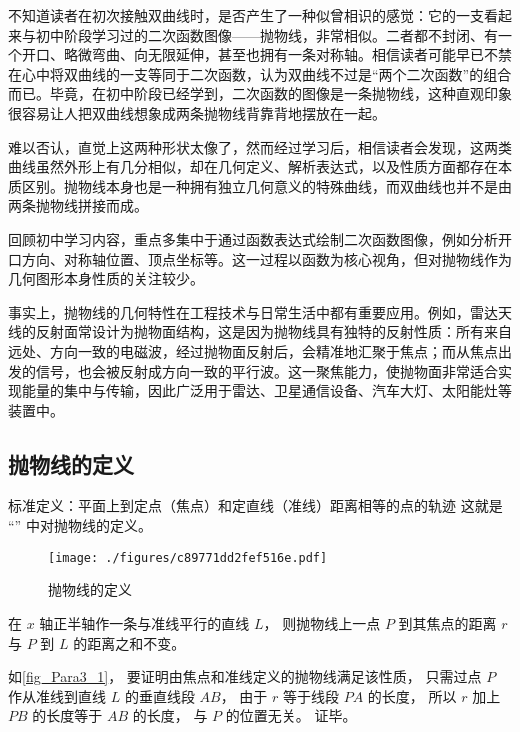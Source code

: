 
\begin{issues}
\issueDraft
\end{issues}


不知道读者在初次接触双曲线时，是否产生了一种似曾相识的感觉：它的一支看起来与初中阶段学习过的二次函数图像——抛物线，非常相似。二者都不封闭、有一个开口、略微弯曲、向无限延伸，甚至也拥有一条对称轴。相信读者可能早已不禁在心中将双曲线的一支等同于二次函数，认为双曲线不过是“两个二次函数”的组合而已。毕竟，在初中阶段已经学到，二次函数的图像是一条抛物线，这种直观印象很容易让人把双曲线想象成两条抛物线背靠背地摆放在一起。

难以否认，直觉上这两种形状太像了，然而经过学习后，相信读者会发现，这两类曲线虽然外形上有几分相似，却在几何定义、解析表达式，以及性质方面都存在本质区别。抛物线本身也是一种拥有独立几何意义的特殊曲线，而双曲线也并不是由两条抛物线拼接而成。

回顾初中学习内容，重点多集中于通过函数表达式绘制二次函数图像，例如分析开口方向、对称轴位置、顶点坐标等。这一过程以函数为核心视角，但对抛物线作为几何图形本身性质的关注较少。

事实上，抛物线的几何特性在工程技术与日常生活中都有重要应用。例如，雷达天线的反射面常设计为抛物面结构，这是因为抛物线具有独特的反射性质：所有来自远处、方向一致的电磁波，经过抛物面反射后，会精准地汇聚于焦点；而从焦点出发的信号，也会被反射成方向一致的平行波。这一聚焦能力，使抛物面非常适合实现能量的集中与传输，因此广泛用于雷达、卫星通信设备、汽车大灯、太阳能灶等装置中。


\subsection{抛物线的定义}
标准定义：平面上到定点（焦点）和定直线（准线）距离相等的点的轨迹
这就是 “” 中对抛物线的定义。
\begin{figure}[ht]
\centering
\texttt{[image: ./figures/c89771dd2fef516e.pdf]}
\caption{抛物线的定义} \label{fig_Para3_1}
\end{figure}

在 $x$ 轴正半轴作一条与准线平行的直线 $L$， 则抛物线上一点 $P$ 到其焦点的距离 $r$ 与 $P$ 到 $L$ 的距离之和不变。

如\autoref{fig_Para3_1}， 要证明由焦点和准线定义的抛物线满足该性质， 只需过点 $P$ 作从准线到直线 $L$ 的垂直线段 $AB$， 由于 $r$ 等于线段 $PA$ 的长度， 所以 $r$ 加上 $PB$ 的长度等于 $AB$ 的长度， 与 $P$ 的位置无关。 证毕。


